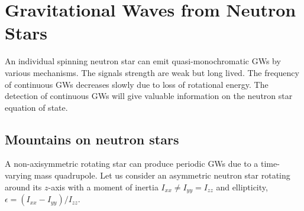 \documentclass{ttuthes2007}
\begin{document}
\section{Gravitational Waves from Neutron Stars}
An individual spinning neutron star can emit quasi-monochromatic \acp{GW} by
various mechanisms. The signals strength are weak but long lived. The frequency
of continuous \acp{GW} decreases slowly due to loss of rotational energy. The
detection of continuous \acp{GW} will give valuable information on the neutron star
equation of state.

\subsection{Mountains on neutron stars}
A non-axisymmetric rotating star can produce periodic \acp{GW} due to a time-varying mass quadrupole. Let us consider an asymmetric neutron star rotating
around its $z$-axis with a moment of inertia $I_{xx}\neq I_{yy}=I_{zz}$ and
ellipticity, $\epsilon=(I_{xx}-I_{yy})/I_{zz}$.
\end{document}
